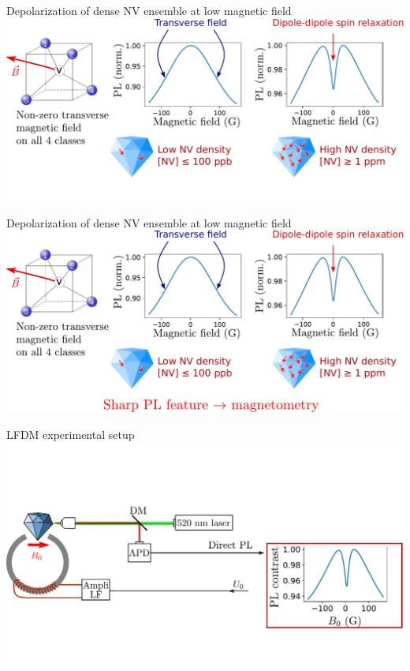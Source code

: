 \documentclass{beamer}
\begin{document}
\begin{frame}{Depolarization of dense NV ensemble at low magnetic field}
\centering
\includegraphics[width=\textwidth,height=0.85\textheight,keepaspectratio]{slide_low_field_depolarization_f_-1}
\end{frame}

\begin{frame}{Depolarization of dense NV ensemble at low magnetic field}
\centering
\includegraphics[width=\textwidth,height=0.85\textheight,keepaspectratio]{slide_low_field_depolarization_f}
\end{frame}

\begin{frame}{LFDM experimental setup}
\centering
\includegraphics[width=\textwidth,height=0.85\textheight,keepaspectratio]{Slide_principle_LFDM_f-2}
\end{frame}
\end{document}

